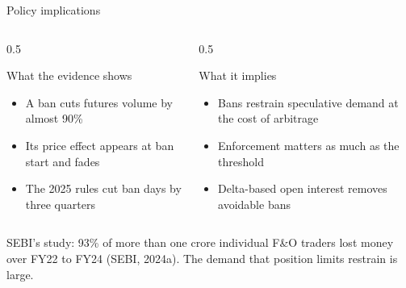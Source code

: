 \documentclass[11pt]{beamer}
\begin{document}
\begin{frame}{Policy implications}
  \begin{columns}[T]
    \begin{column}{0.5\textwidth}
      \begin{block}{What the evidence shows}
        \scriptsize
        \begin{itemize}
          \item A ban cuts futures volume by almost 90\%
          \item Its price effect appears at ban start and fades
          \item The 2025 rules cut ban days by three quarters
        \end{itemize}
      \end{block}
    \end{column}
    \begin{column}{0.5\textwidth}
      \begin{block}{What it implies}
        \scriptsize
        \begin{itemize}
          \item Bans restrain speculative demand at the cost of arbitrage
          \item Enforcement matters as much as the threshold
          \item Delta-based open interest removes avoidable bans
        \end{itemize}
      \end{block}
    \end{column}
  \end{columns}
  \vspace{6pt}
  \small SEBI's study: 93\% of more than one crore individual F\&O traders lost money over FY22 to FY24 (SEBI, 2024a).
  The demand that position limits restrain is large.
\end{frame}
\end{document}
